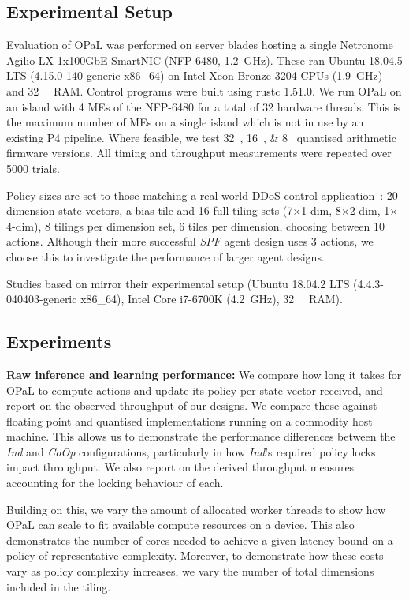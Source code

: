 \documentclass[sigconf,natbib=false]{acmart}
\newcommand{\fakepara}[1]{\noindent\textbf{#1:}}
\newcommand{\approachshort}{OPaL}
\newcommand{\Coopfw}{CoOp}
\newcommand{\coopfw}{\Coopfw}
\newcommand{\Indfw}{Ind}
\newcommand{\indfw}{\Indfw}
\begin{document}
\subsection{Experimental Setup}
Evaluation of \approachshort{} was performed on server blades hosting a single Netronome Agilio LX 1x100GbE SmartNIC (NFP-6480, \SI{1.2}{\giga\hertz}).
These ran Ubuntu 18.04.5 LTS (4.15.0-140-generic x86\_64) on Intel Xeon Bronze 3204 CPUs (\SI{1.9}{\giga\hertz}) and \SI{32}{\gibi\byte} RAM.
Control programs were built using rustc 1.51.0.
We run \approachshort{} on an island with \num{4} MEs of the NFP-6480 for a total of \num{32} hardware threads.
This is the maximum number of MEs on a single island which is not in use by an existing P4 pipeline.
Where feasible, we test \SIlist{32;16;8}{\bit} quantised arithmetic firmware versions.
All timing and throughput measurements were repeated over \num{5000} trials.

Policy sizes are set to those matching a real-world DDoS control application~\parencite{DBLP:journals/tnsm/SimpsonRP20}: 20-dimension state vectors, a bias tile and 16 full tiling sets (7$\times$1-dim, 8$\times$2-dim, 1$\times$4-dim), 8 tilings per dimension set, 6 tiles per dimension, choosing between 10 actions.
Although their more successful \emph{SPF} agent design uses 3 actions, we choose this to investigate the performance of larger agent designs.

Studies based on \textcite{DBLP:journals/tnsm/SimpsonRP20} mirror their experimental setup (Ubuntu 18.04.2 LTS (4.4.3-040403-generic x86\_64), Intel Core i7-6700K (\SI{4.2}{\giga\hertz}), \SI{32}{\gibi\byte} RAM).

\subsection{Experiments}

\fakepara{Raw inference and learning performance}
We compare how long it takes for \approachshort{} to compute actions and update its policy per state vector received, and report on the observed throughput of our designs.
We compare these against floating point and quantised implementations running on a commodity host machine.
This allows us to demonstrate the performance differences between the \emph{\indfw} and \emph{\coopfw} configurations, particularly in how \emph{\indfw}'s required policy locks impact throughput.
We also report on the derived throughput measures accounting for the locking behaviour of each.

Building on this, we vary the amount of allocated worker threads to show how \approachshort{} can scale to fit available compute resources on a device.
This also demonstrates the number of cores needed to achieve a given latency bound on a policy of representative complexity.
Moreover, to demonstrate how these costs vary as policy complexity increases, we vary the number of total dimensions included in the tiling.
\end{document}
